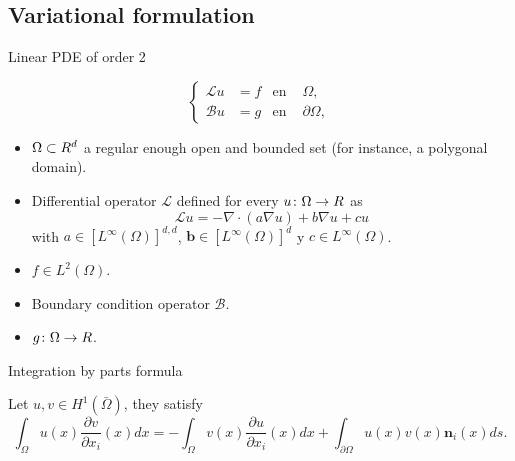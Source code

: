 \subsection{Variational formulation}

\begin{frame}{Linear PDE of order 2}
\begin{block}{}
\begin{equation*}
\label{ecuacion_general}
\left\{
\begin{aligned}
\mathcal{L}u&=f & \text{en } &\Omega, \\
\mathcal{B}u&=g & \text{en } &\partial\Omega,
\end{aligned}
\right.
\end{equation*}
\end{block}

\begin{itemize}\itemsep1em
\item $\Omega\subset \relax R^d$ a regular enough open and bounded set (for instance, a polygonal domain).
\item Differential operator $\mathcal{L}$ defined for every $u\colon\Omega\to\relax R$ as $$\mathcal{L}u=-\nabla\cdot(a\nabla u)+b\nabla u+c u$$ with $a\in [L^\infty(\Omega)]^{d,d}$, $\mathbf{b}\in [L^\infty(\Omega)]^d$ y $c\in L^\infty(\Omega)$.
\item $f\in L^2(\Omega)$.
\item Boundary condition operator $\mathcal{B}$.
\item $g\colon\Omega\to\relax R$.
\end{itemize}

\end{frame}

\begin{frame}{Integration by parts formula}
	\begin{theorem}
		
		Let $u, v\in H^1(\bar\Omega)$, they satisfy
		\begin{equation*}
		\label{formula_int_por_partes}
		\int_\Omega u(x)\frac{\partial v}{\partial x_i}(x)dx=-\int_\Omega v(x)\frac{\partial u}{\partial x_i}(x)dx+\int_{\partial \Omega}u(x)v(x)\mathbf{n}_i(x)ds.
		\end{equation*}
		
	\end{theorem}
	
\end{frame}

